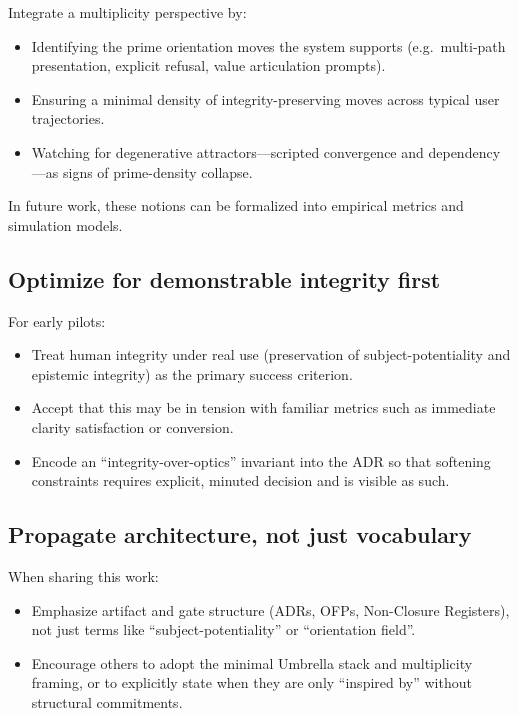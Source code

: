 \documentclass[11pt]{article}
\begin{document}
Integrate a multiplicity perspective by:

\begin{itemize}[nosep]
  \item Identifying the prime orientation moves the system supports (e.g.\ multi-path presentation, explicit refusal, value articulation prompts).
  \item Ensuring a minimal density of integrity-preserving moves across typical user trajectories.
  \item Watching for degenerative attractors---scripted convergence and dependency---as signs of prime-density collapse.
\end{itemize}

In future work, these notions can be formalized into empirical metrics and simulation models.

\subsection{Optimize for demonstrable integrity first}

For early pilots:

\begin{itemize}[nosep]
  \item Treat human integrity under real use (preservation of subject-potentiality and epistemic integrity) as the primary success criterion.
  \item Accept that this may be in tension with familiar metrics such as immediate clarity satisfaction or conversion.
  \item Encode an ``integrity-over-optics'' invariant into the ADR so that softening constraints requires explicit, minuted decision and is visible as such.
\end{itemize}

\subsection{Propagate architecture, not just vocabulary}

When sharing this work:

\begin{itemize}[nosep]
  \item Emphasize artifact and gate structure (ADRs, OFPs, Non-Closure Registers), not just terms like ``subject-potentiality'' or ``orientation field''.
  \item Encourage others to adopt the minimal Umbrella stack and multiplicity framing, or to explicitly state when they are only ``inspired by'' without structural commitments.
\end{itemize}
\end{document}
